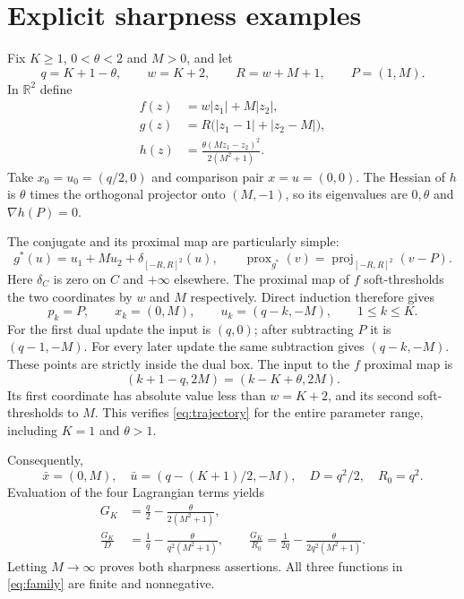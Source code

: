 \documentclass[11pt,a4paper]{article}
\theoremstyle{remark}\newtheorem{remark}[theorem]{Remark}
\DeclareMathOperator{\prox}{prox}
\newcommand{\R}{\mathbb R}
\begin{document}
\section{Explicit sharpness examples}

Fix $K\ge1$, $0<\theta<2$ and $M>0$, and let
\[
q=K+1-\theta,\qquad w=K+2,\qquad R=w+M+1,\qquad P=(1,M).
\]
In $\R^2$ define
\begin{align}
f(z)&=w|z_1|+M|z_2|,\nonumber\\
g(z)&=R\bigl(|z_1-1|+|z_2-M|\bigr),\label{eq:family}\\
h(z)&=\frac{\theta(Mz_1-z_2)^2}{2(M^2+1)}.\nonumber
\end{align}
Take $x_0=u_0=(q/2,0)$ and comparison pair $x=u=(0,0)$. The Hessian of $h$ is $\theta$ times the orthogonal projector onto $(M,-1)$, so its eigenvalues are $0,\theta$ and $\nabla h(P)=0$.

The conjugate and its proximal map are particularly simple:
\[
g^*(u)=u_1+Mu_2+\delta_{[-R,R]^2}(u),\qquad
\prox_{g^*}(v)=\operatorname{proj}_{[-R,R]^2}(v-P).
\]
Here $\delta_C$ is zero on $C$ and $+\infty$ elsewhere. The proximal map of $f$ soft-thresholds the two coordinates by $w$ and $M$ respectively. Direct induction therefore gives
\begin{equation}\label{eq:trajectory}
p_k=P,\qquad x_k=(0,M),\qquad u_k=(q-k,-M),\qquad 1\le k\le K.
\end{equation}
For the first dual update the input is $(q,0)$; after subtracting $P$ it is $(q-1,-M)$. For every later update the same subtraction gives $(q-k,-M)$. These points are strictly inside the dual box. The input to the $f$ proximal map is
\[
(k+1-q,2M)=(k-K+\theta,2M).
\]
Its first coordinate has absolute value less than $w=K+2$, and its second soft-thresholds to $M$. This verifies \eqref{eq:trajectory} for the entire parameter range, including $K=1$ and $\theta>1$.

Consequently,
\[
\bar x=(0,M),\quad \bar u=(q-(K+1)/2,-M),\quad D=q^2/2,\quad R_0=q^2.
\]
Evaluation of the four Lagrangian terms yields
\begin{align}
G_K&=\frac q2-\frac{\theta}{2(M^2+1)},\label{eq:family-gap}\\
\frac{G_K}{D}&=\frac1q-\frac{\theta}{q^2(M^2+1)},\qquad
\frac{G_K}{R_0}=\frac1{2q}-\frac{\theta}{2q^2(M^2+1)}.\label{eq:family-ratio}
\end{align}
Letting $M\to\infty$ proves both sharpness assertions. All three functions in \eqref{eq:family} are finite and nonnegative.
\end{document}
